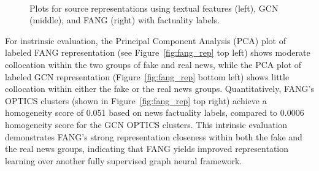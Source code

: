 \documentclass[sigconf]{acmart}
\theoremstyle{definition}
\theoremstyle{hypothesis}
\begin{document}
\begin{figure}[t]
\centering
{}
\\
\caption{Plots for source representations using textual features (left), GCN (middle), and FANG (right) with factuality labels.}
\label{fig:source_rep}
\end{figure}

For instrinsic evaluation, the Principal Component Analysis (PCA) plot of labeled FANG representation (see Figure~\ref{fig:fang_rep} top left) shows moderate collocation within the two groups of fake and real news, while the PCA plot of labeled GCN representation (Figure~\ref{fig:fang_rep} bottom left) shows little collocation within either the fake or the real news groups. Quantitatively, FANG's OPTICS clusters (shown in Figure~\ref{fig:fang_rep} top right) achieve a homogeneity score of 0.051 based on news factuality labels, compared to 0.0006 homogeneity score for the GCN OPTICS clusters. This intrinsic evaluation demonstrates FANG's strong representation closeness within both the fake and the real news groups, indicating that FANG yields improved representation learning over another fully supervised graph neural framework. 
\end{document}
